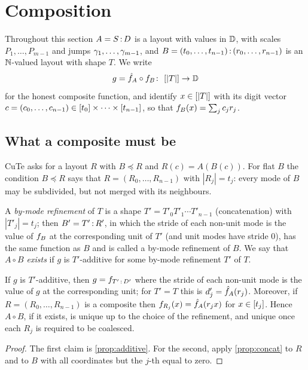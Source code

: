 \section{Composition}\label{sec:composition}

Throughout this section $A=S\,{:}\,D$ is a layout with values in $\mathbb{D}$, with scales
$P_1,\dots,P_{m-1}$ and jumps $\gamma_1,\dots,\gamma_{m-1}$, and
$B=(t_0,\dots,t_{n-1})\,{:}\,(r_0,\dots,r_{n-1})$ is an $\mathbb{N}$-valued layout with shape $T$. We
write
\[ g=\ext A\circ\bnd B\colon\ \rng{|T|}\to\D \]
for the honest composite function, and identify $x\in[|T|]$ with its digit vector
$c=(c_0,\dots,c_{n-1})\in[t_0]\times\dots\times[t_{n-1}]$, so that
$f_{B}(x)=\sum_jc_jr_j$.

\subsection{What a composite must be}

CuTe asks for a layout $R$ with $B\preceq R$ and $R(c)=A(B(c))$. For flat $B$ the condition
$B\preceq R$ says that $R=(R_0,\dots,R_{n-1})$ with $|R_j|=t_j$: every mode of $B$ may be
subdivided, but not merged with its neighbours.

\begin{definition}\label{def:composition}
A \emph{by-mode refinement} of $T$ is a shape $T'=T'_0T'_1\cdots T'_{n-1}$ (concatenation) with
$|T'_j|=t_j$; then $B'=T'\,{:}\,R'$, in which the stride of each non-unit mode is the value of
$f_{B}$ at the corresponding unit of $T'$ (and unit modes have stride $0$), has the same function
as $B$ and is called a by-mode refinement of $B$. We say that
\emph{$A\circ B$ exists} if $g$ is $T'$-additive for some by-mode refinement $T'$ of $T$.
\end{definition}

\begin{lemma}[the composite is forced; case $T'=T$\mech]\label{lem:forced}
If $g$ is $T'$-additive, then $g=f_{T'\,{:}\,D'}$ where the stride of each non-unit mode is the
value of $g$ at the corresponding unit; for $T'=T$ this is $d'_j=\hat{f}_{A}(r_j)$. Moreover, if
$R=(R_0,\dots,R_{n-1})$ is a composite then $f_{R_j}(x)=\hat{f}_{A}(r_jx)$ for $x\in[t_j]$.
Hence $A\circ B$, if it exists, is unique up to the choice of the refinement, and unique once each
$R_j$ is required to be coalesced.
\end{lemma}
\begin{proof}
The first claim is \cref{prop:additive}. For the second, apply \cref{prop:concat} to $R$ and to
$B$ with all coordinates but the $j$-th equal to zero.
\end{proof}


